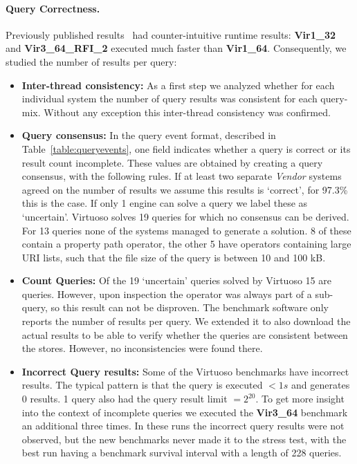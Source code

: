 \documentclass[twocolumn]{bmcart}%
\newcommand{\sql}[1]{\textsc{\scalebox{0.8}{#1}}}
\newcommand\todo[1]{\textcolor{red}{#1}}
\begin{document}
\paragraph{Query Correctness.}

Previously published results~\cite{dewitte_swat4ls_2016} had counter-intuitive runtime results:  \textbf{ Vir1\_32} and \textbf{Vir3\_64\_RFI\_2} executed much faster than \textbf{Vir1\_64}. 
Consequently, we studied the number of results per query:


\begin{itemize}
	\item \textbf{Inter-thread consistency:} As a first step we analyzed whether for each individual system the number of query results was consistent for each query-mix. 
	Without any exception this inter-thread consistency was confirmed.
	
	\item \textbf{Query consensus:} In the query event format, described in Table~\ref{table:queryevents}, one field indicates whether a query is correct or its result count incomplete. These values are obtained by creating a query consensus, with the following rules. If at least two separate \emph{Vendor} systems agreed on the number of results we assume this results is `correct', for 97.3\% this is the case. If only 1 engine can solve a query we label these as `uncertain'. Virtuoso solves 19 queries for which no consensus can be derived. For 13 queries none of the systems managed to generate a solution. 8 of these contain a property path operator, the other 5 have \sql{FILTER IN} operators containing large URI lists, such that the file size of the query is between 10 and 100 kB.
	
	\item \textbf{Count Queries:} Of the 19 `uncertain' queries solved by Virtuoso 15 are \sql{count} queries. However, upon inspection the \sql{count} operator was always part of a sub-query, so this result can not be disproven. The benchmark software only reports the number of results per query. We extended it to also download the actual results to be able to verify whether the \sql{count} queries are consistent between the stores. However, no inconsistencies were found there.
	
	\item \textbf{Incorrect Query results:} Some of the Virtuoso benchmarks have incorrect results. The typical pattern is that the query is executed $< 1s$ and generates 0 results. 1 query also had the query result limit $ = 2^{20}$. To get more insight into the context of incomplete queries we executed the \textbf{Vir3\_64} benchmark an additional three times. In these runs the incorrect query results were not observed, but the new benchmarks never made it to the stress test, with the best run having a benchmark survival interval with a length of 228 queries.
\end{itemize}
\end{document}
